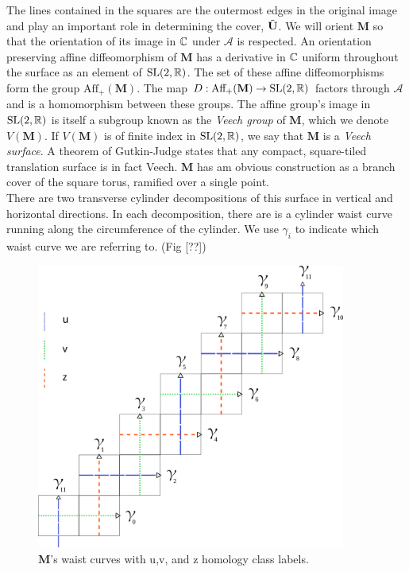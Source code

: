 \documentclass[a4paper, 11pt]{article}
\def\cA{\mathcal{A}}\def\cB{\mathcal{B}}\def\cC{\mathcal{C}}\def\cD{\mathcal{D}}\def\cE{\mathcal{E}}\def\cF{\mathcal{F}}\def\cG{\mathcal{G}}\def\cH{\mathcal{H}}\def\cI{\mathcal{I}}\def\cJ{\mathcal{J}}\def\cK{\mathcal{K}}\def\cL{\mathcal{L}}\def\cM{\mathcal{M}}\def\cN{\mathcal{N}}\def\cO{\mathcal{O}}\def\cP{\mathcal{P}}\def\cQ{\mathcal{Q}}\def\cR{\mathcal{R}}\def\cS{\mathcal{S}}\def\cT{\mathcal{T}}\def\cU{\mathcal{U}}\def\cV{\mathcal{V}}\def\cW{\mathcal{W}}\def\cX{\mathcal{X}}\def\cY{\mathcal{Y}}\def\cZ{\mathcal{Z}}
\def\bM{\mathbf{M}}
\begin{document}
The lines contained in the squares are the outermost edges in the original image and play an important role in determining the cover, $\tilde{\mathbf{U}}$. We will orient $\bM$ so that the orientation of its image in $\mathbb{C}$ under $\cA$ is respected. An orientation preserving affine diffeomorphism of $\bM$ has a derivative in $\mathbb{C}$ uniform throughout the surface as an element of $\mathrm{SL}(2,\mathbb{R})$. The set of these affine diffeomorphisms form the group $\text{Aff}_+(\bM)$. The map $D:\text{Aff}_+(\bM)\rightarrow\SL(2,\RR)$ factors through $\cA$ and is a homomorphism between these groups. The affine group's image in $\mathrm{SL}(2,\mathbb{R})$ is itself a subgroup known as the \emph{Veech group} of $\bM$, which we denote $V(\bM)$. If $V(\bM)$ is of finite index in $\mathrm{SL}(2,\mathbb{R})$, we say that $\bM$ is a \emph{Veech surface}. A theorem of Gutkin-Judge states that any compact, square-tiled translation surface is in fact Veech. $\bM$  has am obvious construction as a branch cover of the square torus, ramified over a single point.\\

\noindent There are two transverse cylinder decompositions of this surface in vertical and horizontal directions. In each decomposition, there are is a cylinder waist curve running along the circumference of the cylinder. We use $\gamma_i$ to indicate which waist curve we are referring to. (Fig [??])

\begin{figure}[H]
\includegraphics[width=4in]{homologyclass.png}
\centering
\caption{$\bM$'s waist curves with u,v, and z homology class labels.}
\label{fig:homology}
\end{figure}
\end{document}
